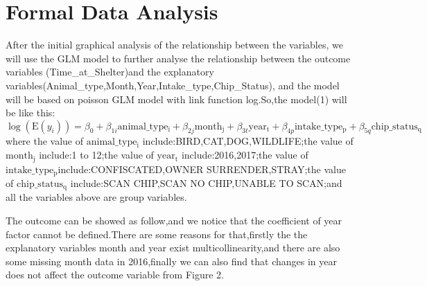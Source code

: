 \documentclass[
]{article}
\begin{document}
\hypertarget{formal-data-analysis}{%
\section{Formal Data Analysis}\label{formal-data-analysis}}

After the initial graphical analysis of the relationship between the
variables, we will use the GLM model to further analyse the relationship
between the outcome variables (Time\_at\_Shelter)and the explanatory
variables(Animal\_type,Month,Year,Intake\_type,Chip\_Status), and the
model will be based on poisson GLM model with link function log.So,the
model(1) will be like this: \[
\log(\mathrm{E}(y_i)) = \beta_0 + \beta_{1i} \mathrm{animal\_type_i} + \beta_{2j} \mathrm{month_j} + \beta_{3t} \mathrm{year_t} + \beta_{4p} \mathrm{intake\_type_p} + \beta_{5q} \mathrm{chip\_status_q}
\] where the value of \(\mathrm{animal\_type_i}\)
include:BIRD,CAT,DOG,WILDLIFE;the value of \(\mathrm{month_j}\)
include:1 to 12;the value of \(\mathrm{year_t}\) include:2016,2017;the
value of \(\mathrm{intake\_type_p}\)include:CONFISCATED,OWNER
SURRENDER,STRAY;the value of \(\mathrm{chip\_status_q}\) include:SCAN
CHIP,SCAN NO CHIP,UNABLE TO SCAN;and all the variables above are group
variables.

The outcome can be showed as follow,and we notice that the coefficient
of year factor cannot be defined.There are some reasons for that,firstly
the the explanatory variables month and year exist multicollinearity,and
there are also some missing month data in 2016,finally we can also find
that changes in year does not affect the outcome variable from Figure 2.
\end{document}
